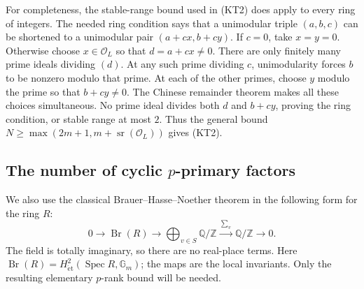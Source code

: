 For completeness, the stable-range bound used in (KT2)
does apply to every ring of integers.  The needed ring
condition says that a unimodular triple \((a,b,c)\) can
be shortened to a unimodular pair \((a+cx,b+cy)\).
If \(c=0\), take \(x=y=0\).
Otherwise choose \(x\in\mathcal O_L\) so that \(d=a+cx\ne0\).
There are only finitely many prime ideals dividing \((d)\).
At any such prime dividing \(c\), unimodularity forces
\(b\) to be nonzero modulo that prime.
At each of the other primes, choose \(y\) modulo the prime
so that \(b+cy\ne0\).  The Chinese remainder theorem makes
all these choices simultaneous.
No prime ideal divides both \(d\) and \(b+cy\), proving
the ring condition, or stable range at most \(2\).
Thus the general bound
\(N\ge\max(2m+1,m+\operatorname{sr}(\mathcal O_L))\)
gives (KT2).

\subsection{The number of cyclic \texorpdfstring{$p$}{p}-primary factors}

We also use the classical Brauer--Hasse--Noether theorem
in the following form for the ring \(R\):
\[
 0\longrightarrow\operatorname{Br}(R)
   \longrightarrow\bigoplus_{v\in S}\mathbb Q/\mathbb Z
   \xrightarrow{\ \sum_v\ }\mathbb Q/\mathbb Z
   \longrightarrow0.
 \tag{KT5}
\]
The field is totally imaginary, so there are no real-place
terms.  Here \(\operatorname{Br}(R)=
H^2_{\mathrm{\acute et}}(\operatorname{Spec}R,\mathbb G_m)\);
the maps are the local invariants.
\cite[VI, equation (8.1.1)]{weibel-kbook}
Only the resulting elementary \(p\)-rank bound will be needed.

